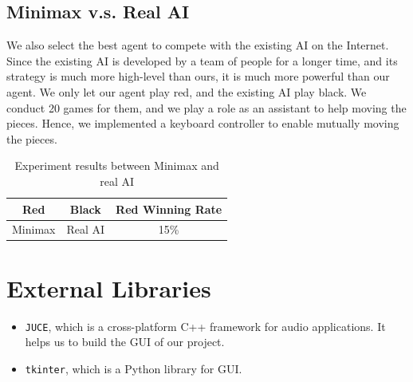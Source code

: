 \documentclass[letterpaper]{article}
\begin{document}
\subsection{Minimax v.s. Real AI}
\label{subsec:minimax-v.s.-real-ai}
We also select the best agent to compete with the existing AI on the Internet.
Since the existing AI is developed by a team of people for a longer time, and its strategy is much more high-level than ours, it is much more powerful than our agent.
We only let our agent play red, and the existing AI play black.
We conduct 20 games for them, and we play a role as an assistant to help moving the pieces.
Hence, we implemented a keyboard controller to enable mutually moving the pieces.
\begin{table}[htbp]
    \centering
    \caption{Experiment results between Minimax and real AI}
    \label{tab:tab3}
    \begin{tabular}{|c|c|c|}
        \hline
        Red & Black & Red Winning Rate  \\ \hline
        Minimax & Real AI & 15\% \\ \hline
    \end{tabular}
\end{table}


\section{External Libraries}\label{sec:acknowledgements}

\begin{itemize}
    \item \texttt{JUCE}, which is a cross-platform C++ framework for audio applications.
    It helps us to build the GUI of our project.
    \item \texttt{tkinter}, which is a Python library for GUI\@.
\end{itemize}



\end{document}
